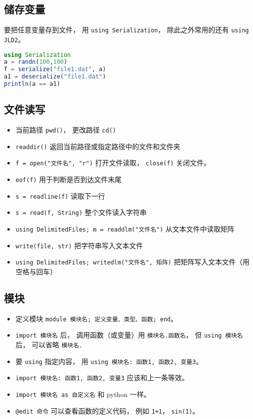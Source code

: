 \subsection{储存变量}
要把任意变量存到文件， 用 \verb|using Serialization|， 除此之外常用的还有 \verb|using JLD2|。
\begin{lstlisting}[language=julia]
using Serialization
a = randn(100,100)
f = serialize("file1.dat", a)
a1 = deserialize("file1.dat")
println(a == a1)
\end{lstlisting}

\subsection{文件读写}
\begin{itemize}
\item 当前路径 \verb|pwd()|， 更改路径 \verb|cd()|
\item \verb|readdir()| 返回当前路径或指定路径中的文件和文件夹
\item \verb|f = open("文件名", "r")| 打开文件读取， \verb|close(f)| 关闭文件。
\item \verb|eof(f)| 用于判断是否到达文件末尾
\item \verb|s = readline(f)| 读取下一行
\item \verb|s = read(f, String)| 整个文件读入字符串
\item \verb|using DelimitedFiles; m = readdlm("文件名")| 从文本文件中读取矩阵
\item \verb|write(file, str)| 把字符串写入文本文件
\item \verb|using DelimitedFiles; writedlm("文件名", 矩阵)| 把矩阵写入文本文件（用空格与回车）
\end{itemize}

\subsection{模块}
\begin{itemize}
\item 定义模块 \verb|module 模块名; 定义变量、类型、函数; end|。
\item \verb|import 模块名| 后， 调用函数（或变量）用 \verb|模块名.函数名|， 但 \verb|using 模块名| 后， 可以省略 \verb|模块名.|
\item 要 \verb|using| 指定内容， 用 \verb|using 模块名: 函数1, 函数2, 变量3|。
\item \verb|import 模块名: 函数1, 函数2, 变量3| 应该和上一条等效。
\item \verb|import 模块名 as 自定义名| 和 python 一样。
\item \verb|@edit 命令| 可以查看函数的定义代码， 例如 \verb|1+1|， \verb|sin(1)|。
\end{itemize}

